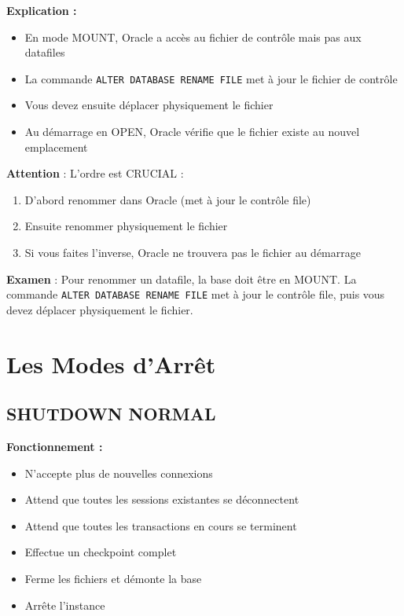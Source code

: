 \documentclass[11pt,a4paper]{article}
\begin{document}
\textbf{Explication :}

\begin{itemize}
    \item En mode MOUNT, Oracle a accès au fichier de contrôle mais pas aux datafiles
    \item La commande \texttt{ALTER DATABASE RENAME FILE} met à jour le fichier de contrôle
    \item Vous devez ensuite déplacer physiquement le fichier
    \item Au démarrage en OPEN, Oracle vérifie que le fichier existe au nouvel emplacement
\end{itemize}

\begin{dangerbox}
\textbf{Attention} : L'ordre est CRUCIAL :
\begin{enumerate}
    \item D'abord renommer dans Oracle (met à jour le contrôle file)
    \item Ensuite renommer physiquement le fichier
    \item Si vous faites l'inverse, Oracle ne trouvera pas le fichier au démarrage
\end{enumerate}
\end{dangerbox}

\begin{tipbox}
\textbf{Examen} : Pour renommer un datafile, la base doit être en MOUNT. La commande \texttt{ALTER DATABASE RENAME FILE} met à jour le contrôle file, puis vous devez déplacer physiquement le fichier.
\end{tipbox}

\section{Les Modes d'Arrêt}

\subsection{SHUTDOWN NORMAL}

\textbf{Fonctionnement :}
\begin{itemize}
    \item N'accepte plus de nouvelles connexions
    \item Attend que toutes les sessions existantes se déconnectent
    \item Attend que toutes les transactions en cours se terminent
    \item Effectue un checkpoint complet
    \item Ferme les fichiers et démonte la base
    \item Arrête l'instance
\end{itemize}
\end{document}
